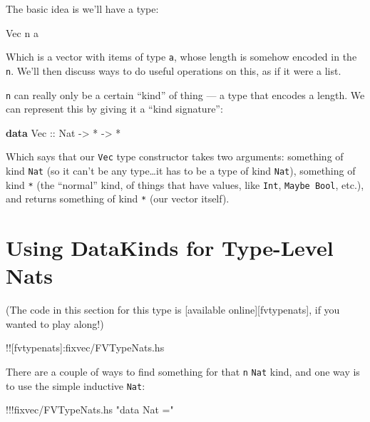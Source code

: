 \documentclass[]{article}
\newenvironment{Shaded}{}{}
\newcommand{\KeywordTok}[1]{\textcolor[rgb]{0.00,0.44,0.13}{\textbf{{#1}}}}
\newcommand{\DataTypeTok}[1]{\textcolor[rgb]{0.56,0.13,0.00}{{#1}}}
\newcommand{\StringTok}[1]{\textcolor[rgb]{0.25,0.44,0.63}{{#1}}}
\newcommand{\OtherTok}[1]{\textcolor[rgb]{0.00,0.44,0.13}{{#1}}}
\newcommand{\FunctionTok}[1]{\textcolor[rgb]{0.02,0.16,0.49}{{#1}}}
\newcommand{\NormalTok}[1]{{#1}}
\begin{document}
The basic idea is we'll have a type:

\begin{Shaded}
\begin{Highlighting}[]
\DataTypeTok{Vec} \NormalTok{n a}
\end{Highlighting}
\end{Shaded}

Which is a vector with items of type \texttt{a}, whose length is somehow
encoded in the \texttt{n}. We'll then discuss ways to do useful
operations on this, as if it were a list.

\texttt{n} can really only be a certain ``kind'' of thing --- a type
that encodes a length. We can represent this by giving it a ``kind
signature'':

\begin{Shaded}
\begin{Highlighting}[]
\KeywordTok{data} \DataTypeTok{Vec}\OtherTok{ ::} \DataTypeTok{Nat} \OtherTok{->} \FunctionTok{*} \OtherTok{->} \FunctionTok{*}
\end{Highlighting}
\end{Shaded}

Which says that our \texttt{Vec} type constructor takes two arguments:
something of kind \texttt{Nat} (so it can't be any type\ldots{}it has to
be a type of kind \texttt{Nat}), something of kind \texttt{*} (the
``normal'' kind, of things that have values, like \texttt{Int},
\texttt{Maybe\ Bool}, etc.), and returns something of kind \texttt{*}
(our vector itself).

\section{Using DataKinds for Type-Level
Nats}\label{using-datakinds-for-type-level-nats}

(The code in this section for this type is {[}available
online{]}{[}fvtypenats{]}, if you wanted to play along!)

!!{[}fvtypenats{]}:fixvec/FVTypeNats.hs

There are a couple of ways to find something for that \texttt{n}
\texttt{Nat} kind, and one way is to use the simple inductive
\texttt{Nat}:

\begin{Shaded}
\begin{Highlighting}[]
\FunctionTok{!!!}\NormalTok{fixvec}\FunctionTok{/}\NormalTok{FVTypeNats.hs }\StringTok{"data Nat ="}
\end{Highlighting}
\end{Shaded}
\end{document}
